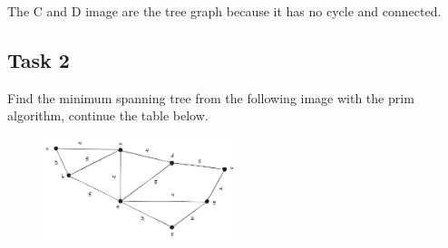 \documentclass[12pt,titlepage]{article}
\begin{document}
The C and D image are the tree graph because it has no cycle and connected.

\subsection*{Task 2}
Find the minimum spanning tree from the following image with the prim algorithm, continue the table below.

\begin{figure}[h]
    \centering
    \includegraphics[width=0.5\textwidth]{images/tree-complete.png}
\end{figure}
\end{document}
